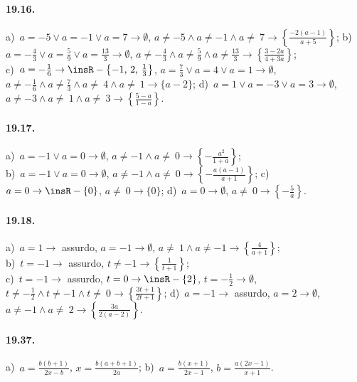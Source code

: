 \paragraph{19.16.}
a)~$a=-5\vee a=-1\vee a=7 \rightarrow \emptyset$, $a\neq -5\wedge a\neq -1\wedge a\neq~7 \rightarrow \left\{\frac{-2(a-1)}{a+5}\right\}$;
\quad b)~$a=-{\frac{4}{3}}\vee a=\frac{5}{9}\vee a=\frac{13}{3} \rightarrow \emptyset$, $a\neq -{\frac{4}{3}}\wedge a\neq \frac{5}{9}\wedge a\neq \frac{13}{3} \rightarrow \left\{\frac{3-2a}{4+3a}\right\}$;
\protect\\ c)~$a=-{\frac{1}{6}} \rightarrow \insR-\left\{-1\text{,~}2\text{,~}\frac{1}{3}\right\}$, $a=\frac{7}{3}\vee a=4\vee a=1 \rightarrow \emptyset$, $a\neq -{\frac{1}{6}}\wedge a\neq \frac{7}{3}\wedge a\neq~4\wedge a\neq~1 \rightarrow \{a-2\}$;
\quad d)~$a=1\vee a=-3\vee a=3 \rightarrow \emptyset$, $a\neq -3\wedge a\neq~1\wedge a\neq~3 \rightarrow \left\{\frac{5-a}{1-a}\right\}$.

\paragraph{19.17.}
a)~$a=-1\vee a=0 \rightarrow \emptyset$, $a\neq -1\wedge a\neq~0 \rightarrow \left\{-{\frac{\ a^{2}}{1+a}}\right\}$;
\protect\\ b)~$a=-1\vee a=0 \rightarrow \emptyset$, $a\neq -1\wedge a\neq~0 \rightarrow \left\{-{\frac{a(a-1)}{a+1}}\right\}$;
\quad c)~$a=0 \rightarrow \insR-\{0\}$, $a\neq~0 \rightarrow \{0\}$;
\quad d)~$a=0 \rightarrow \emptyset$, $a\neq~0 \rightarrow \left\{-{\frac{5}{a}}\right\}$.

\paragraph{19.18.}
a)~$a=1 \rightarrow$ assurdo, $a=-1 \rightarrow \emptyset$, $a\neq~1\wedge a\neq -1 \rightarrow \left\{\frac{4}{a+1}\right\}$;
\protect\\ b)~$t=-1 \rightarrow$ assurdo, $t\neq -1 \rightarrow \left\{\frac{1}{t+1}\right\}$;
\protect\\ c)~$t=-1 \rightarrow$ assurdo, $t=0 \rightarrow \insR-\{2\}$, $t=-{\frac{1}{2}} \rightarrow \emptyset$, $t\neq -\frac{1}{2}\wedge t\neq -1\wedge t\neq~0 \rightarrow \left\{\frac{3t+1}{2t+1}\right\}$;
\quad d)~$a=-1 \rightarrow$ assurdo, $a=2 \rightarrow \emptyset$, $a\neq -1\wedge a\neq~2 \rightarrow \left\{\frac{3a}{2(a-2)}\right\}$.

\paragraph{19.37.}
a)~$a=\frac{b(b+1)}{2x-b}$, $x=\frac{b(a+b+1)}{2a}$;
\quad b)~$a=\frac{b(x+1)}{2x-1}$, $b=\frac{a(2x-1)}{x+1}$.
